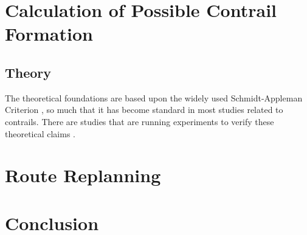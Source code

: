 \documentclass[a4paper, 12pt]{report}
\begin{document}
\chapter{Calculation of Possible Contrail Formation}
\section{Theory}
The theoretical foundations are based upon the widely used Schmidt-Appleman Criterion \cite{appleman1953formation}, so much that it has become standard in most studies related to contrails. There are studies that are running experiments to verify these theoretical claims \cite{ghedhaifi2019influence}.

\chapter{Route Replanning}

\chapter{Conclusion}


\printbibliography
\end{document}
